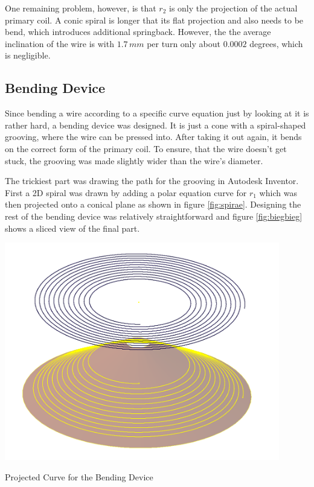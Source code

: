 One remaining problem, however, is that \(r_2\) is only the projection of the actual primary coil. A conic spiral is longer that its flat projection and also needs to be bend, which introduces additional springback. However, the the average inclination of the wire is with \(1.7\,mm\) per turn only about \(0.0002\) degrees, which is negligible.

\subsection{Bending Device}

Since bending a wire according to a specific curve equation just by looking at it is rather hard, a bending device was designed. It is just a cone with a spiral-shaped grooving, where the wire can be pressed into. After taking it out again, it bends on the correct form of the primary coil. To ensure, that the wire doesn't get stuck, the grooving was made slightly wider than the wire's diameter.

The trickiest part was drawing the path for the grooving in Autodesk Inventor. First a 2D spiral was drawn by adding a polar equation curve for \(r_1\) which was then projected onto a conical plane as shown in figure \ref{fig:spirae}. Designing the rest of the bending device was relatively straightforward and figure \ref{fig:biegbieg} shows a sliced view of the final part. %

\begin{marginfigure}[-3cm]
    \centering
    \includegraphics[width=0.9\textwidth]{kassandra/resources/JerJerWoBistDuSpirae.PNG}
    \caption{Projected Curve for the Bending Device}
    \label{fig:spirae}
\end{marginfigure}

